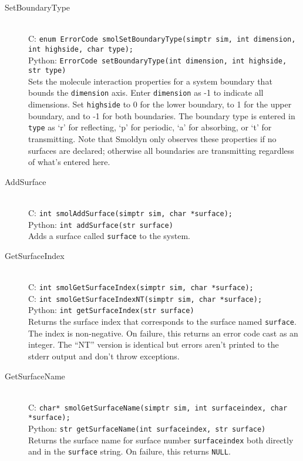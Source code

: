 \documentclass {book}
\begin{document}
\begin{description}

\item[SetBoundaryType]
\hfill \\
C: \texttt{enum ErrorCode smolSetBoundaryType(simptr sim, int dimension, int highside, char type);}\\
Python: \texttt{ErrorCode setBoundaryType(int dimension, int highside, str type)}\\
Sets the molecule interaction properties for a system boundary that bounds the \texttt{dimension} axis. Enter \texttt{dimension} as -1 to indicate all dimensions. Set \texttt{highside} to 0 for the lower boundary, to 1 for the upper boundary, and to -1 for both boundaries. The boundary type is entered in \texttt{type} as `r' for reflecting, `p' for periodic, `a' for absorbing, or `t' for transmitting. Note that Smoldyn only observes these properties if no surfaces are declared; otherwise all boundaries are transmitting regardless of what's entered here.

\item[AddSurface]
\hfill \\
C: \texttt{int smolAddSurface(simptr sim, char *surface);}\\
Python: \texttt{int addSurface(str surface)}\\
Adds a surface called \texttt{surface} to the system.

\item[GetSurfaceIndex]
\hfill \\
C: \texttt{int smolGetSurfaceIndex(simptr sim, char *surface);}\\
C: \texttt{int smolGetSurfaceIndexNT(simptr sim, char *surface);}\\
Python: \texttt{int getSurfaceIndex(str surface)}\\
Returns the surface index that corresponds to the surface named \texttt{surface}. The index is non-negative. On failure, this returns an error code cast as an integer. The ``NT'' version is identical but errors aren't printed to the stderr output and don't throw exceptions.

\item[GetSurfaceName]
\hfill \\
C: \texttt{char* smolGetSurfaceName(simptr sim, int surfaceindex, char *surface);}\\
Python: \texttt{str getSurfaceName(int surfaceindex, str surface)}\\
Returns the surface name for surface number \texttt{surfaceindex} both directly and in the \texttt{surface} string. On failure, this returns \texttt{NULL}.


\end{description}
\end{document}
